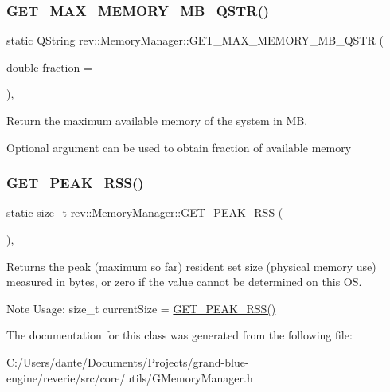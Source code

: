 \subsubsection{\texorpdfstring{GET\_MAX\_MEMORY\_MB\_QSTR()}{GET\_MAX\_MEMORY\_MB\_QSTR()}}
{\footnotesize\ttfamily static Q\+String rev\+::\+Memory\+Manager\+::\+G\+E\+T\+\_\+\+M\+A\+X\+\_\+\+M\+E\+M\+O\+R\+Y\+\_\+\+M\+B\+\_\+\+Q\+S\+TR (\begin{DoxyParamCaption}\item[{double}]{fraction = {} }\end{DoxyParamCaption})\hspace{0.3cm}{\ttfamily [inline]}, {\ttfamily [static]}}



Return the maximum available memory of the system in MB. 

Optional argument can be used to obtain fraction of available memory \mbox{\label{classrev_1_1_memory_manager_a10f2830d7afcd47dd9f2290602b7b5f4}} 
\subsubsection{\texorpdfstring{GET\_PEAK\_RSS()}{GET\_PEAK\_RSS()}}
{\footnotesize\ttfamily static size\+\_\+t rev\+::\+Memory\+Manager\+::\+G\+E\+T\+\_\+\+P\+E\+A\+K\+\_\+\+R\+SS (\begin{DoxyParamCaption}{ }\end{DoxyParamCaption})\hspace{0.3cm}{\ttfamily [inline]}, {\ttfamily [static]}}

Returns the peak (maximum so far) resident set size (physical memory use) measured in bytes, or zero if the value cannot be determined on this OS.\begin{DoxyNote}{Note}
Usage\+: size\+\_\+t current\+Size = \mbox{\hyperlink{classrev_1_1_memory_manager_a10f2830d7afcd47dd9f2290602b7b5f4}{G\+E\+T\+\_\+\+P\+E\+A\+K\+\_\+\+R\+S\+S()}} 
\end{DoxyNote}


The documentation for this class was generated from the following file\+:\begin{DoxyCompactItemize}
\item 
C\+:/\+Users/dante/\+Documents/\+Projects/grand-\/blue-\/engine/reverie/src/core/utils/G\+Memory\+Manager.\+h\end{DoxyCompactItemize}
